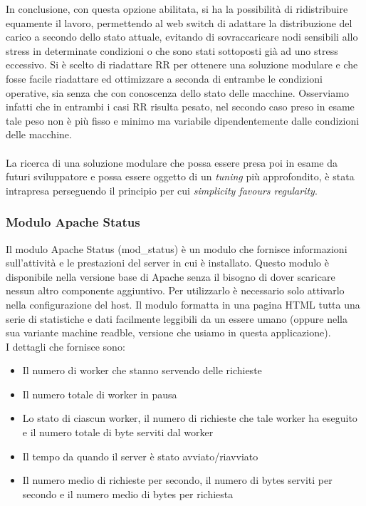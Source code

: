 \documentclass[italian]{tktltiki2}
\begin{document}
In conclusione, con questa opzione abilitata, si ha la possibilità di ridistribuire equamente il lavoro, permettendo al web switch di adattare la distribuzione del carico a secondo dello stato attuale, evitando di sovraccaricare nodi sensibili allo stress in determinate condizioni o che sono stati sottoposti già ad uno stress eccessivo. Si è scelto di riadattare RR per ottenere una soluzione modulare e che fosse facile riadattare ed ottimizzare a seconda di entrambe le condizioni operative, sia senza che con conoscenza dello stato delle macchine. Osserviamo infatti che in entrambi i casi RR risulta pesato, nel secondo caso preso in esame tale peso non è più fisso e minimo ma variabile dipendentemente dalle condizioni delle macchine.\\\\
La ricerca di una soluzione modulare che possa essere presa poi in esame da futuri sviluppatore e possa essere oggetto di un \emph{tuning} più approfondito, è stata intrapresa perseguendo il principio per cui \emph{simplicity favours regularity}.

\subsubsection{Modulo Apache Status}
\label{sssec:apachestatus}
Il modulo Apache Status (mod\_status)\cite{mod_status} è un modulo che fornisce informazioni sull'attività e le prestazioni del server in cui è installato. Questo modulo è disponibile nella versione base di Apache senza il bisogno di dover scaricare nessun altro componente aggiuntivo. Per utilizzarlo è necessario solo attivarlo nella configurazione del host. Il modulo formatta in una pagina HTML tutta una serie di statistiche e dati facilmente leggibili da un essere umano (oppure nella sua variante machine readble, versione che usiamo in questa applicazione).
\\
I dettagli che fornisce sono:

\begin{itemize}
  \item Il numero di worker che stanno servendo delle richieste
  \item Il numero totale di worker in pausa
  \item Lo stato di ciascun worker, il numero di richieste che tale worker ha eseguito e il numero totale di byte serviti dal worker
  \item Il tempo da quando il server è stato avviato/riavviato
  \item Il numero medio di richieste per secondo, il numero di bytes serviti per secondo e il numero medio di bytes per richiesta
\end{itemize}
\end{document}
